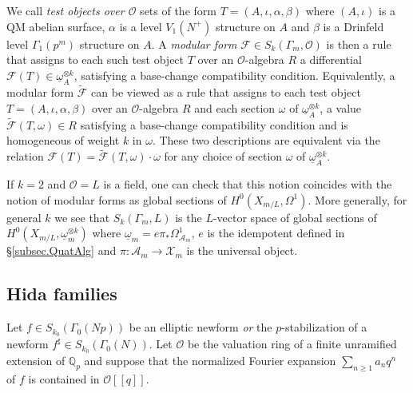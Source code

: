 \documentclass[a4paper,11pt]{amsart}
\numberwithin{equation}{section}
\theoremstyle{plain}
\theoremstyle{definition}
\theoremstyle{remark}
\newcommand{\Q}{\mathbb Q}
\begin{document}
We call \emph{test objects over $\mathcal{O}$} sets of the form $T=(A,\iota,\alpha,\beta)$ where $(A,\iota)$ is a QM abelian surface, $\alpha$ is a level $V_1(N^+)$ structure on $A$ and $\beta$ is a Drinfeld level $\Gamma_1(p^m)$ structure on $A$.
A \emph{modular form} $\mathcal{F} \in S_k(\Gamma_m, \mathcal{O})$ is then a rule that assigns to each such test object $T$ over an $\mathcal{O}$-algebra $R$ a differential $\mathcal{F}(T) \in \underline{\omega}_A^{\otimes k}$,
satisfying a base-change compatibility condition. Equivalently, a modular form $\widetilde{\mathcal{F}}$ can be viewed as a rule that assigns to each test object $T = (A, \iota, \alpha, \beta)$ over an $\mathcal{O}$-algebra $R$ and each section $\omega$ of $\underline{\omega}_A^{\otimes k}$, a value $\widetilde{\mathcal{F}}(T, \omega) \in R$ satisfying a base-change compatibility condition and is homogeneous of weight $k$ in $\omega$. These two descriptions are equivalent via the relation $\mathcal{F}(T) = \widetilde{\mathcal{F}}(T, \omega) \cdot \omega$ for any choice of section $\omega$ of $\underline{\omega}_A^{\otimes k}$.

If $k=2$ and $\mathcal{O}=L$ is a field, one can check that this notion coincides with the notion of modular forms as global sections of $H^0(X_{m/L},\Omega^1)$. More generally, for general $k$ we see that $S_k(\Gamma_m,L)$ is the $L$-vector space of global sections of $H^0(X_{m/L},\underline{\omega}_m^{\otimes{k}})$ where $\underline{\omega}_m=e\pi_*\Omega^1_{\mathcal{A}_m}$, $e$ is the idempotent defined in \S\ref{subsec.QuatAlg} and $\pi\colon\mathcal{A}_m\rightarrow\mathcal{X}_m$ is the universal object. 

\subsection{Hida families}
Let $f\in S_{k_0}(\Gamma_0(Np))$ be an elliptic newform \textit{or} the $p$-stabilization of a newform $f^\sharp\in S_{k_0}(\Gamma_0(N))$. Let $\mathcal{O}$ be the valuation ring of a finite unramified extension of $\Q_p$ and suppose that the normalized Fourier expansion $\sum_{n\geq 1}a_nq^n$ of $f$ is contained in $\mathcal{O}[[q]]$. 
\end{document}
